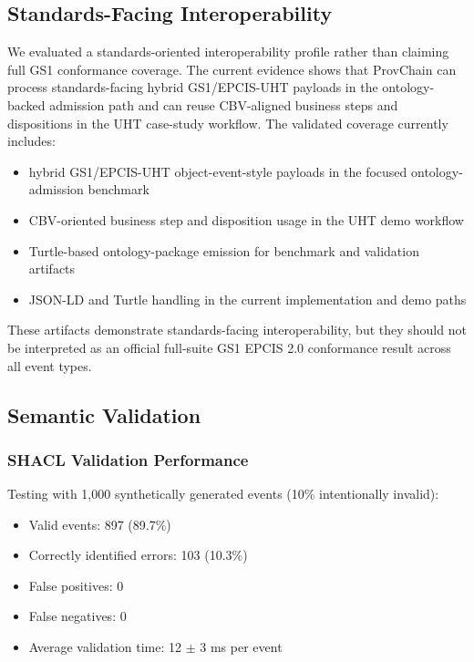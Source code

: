 \documentclass[preprint,review,12pt,authoryear]{elsarticle}
\begin{document}
\subsection{Standards-Facing Interoperability}

We evaluated a standards-oriented interoperability profile rather than claiming full GS1 conformance coverage. The current evidence shows that ProvChain can process standards-facing hybrid GS1/EPCIS-UHT payloads in the ontology-backed admission path and can reuse CBV-aligned business steps and dispositions in the UHT case-study workflow. The validated coverage currently includes:
\begin{itemize}
    \item hybrid GS1/EPCIS-UHT object-event-style payloads in the focused ontology-admission benchmark
    \item CBV-oriented business step and disposition usage in the UHT demo workflow
    \item Turtle-based ontology-package emission for benchmark and validation artifacts
    \item JSON-LD and Turtle handling in the current implementation and demo paths
\end{itemize}

These artifacts demonstrate standards-facing interoperability, but they should not be interpreted as an official full-suite GS1 EPCIS 2.0 conformance result across all event types.

\subsection{Semantic Validation}

\subsubsection{SHACL Validation Performance}

Testing with 1,000 synthetically generated events (10\% intentionally invalid):
\begin{itemize}
    \item Valid events: 897 (89.7\%)
    \item Correctly identified errors: 103 (10.3\%)
    \item False positives: 0
    \item False negatives: 0
    \item Average validation time: 12 $\pm$ 3 ms per event
\end{itemize}
\end{document}
